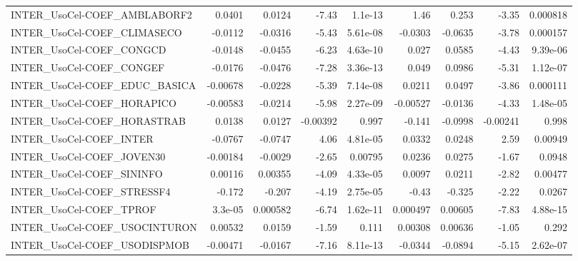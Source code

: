 \begin{tabular}{lrrrrrrrr}
INTER\_UsoCel-COEF\_AMBLABORF2          &      0.0401 &       0.0124 &    -7.43 &  1.1e-13 &       1.46 &       0.253 &        -3.35 &      0.000818 \\
INTER\_UsoCel-COEF\_CLIMASECO           &     -0.0112 &      -0.0316 &    -5.43 & 5.61e-08 &    -0.0303 &     -0.0635 &        -3.78 &      0.000157 \\
INTER\_UsoCel-COEF\_CONGCD              &     -0.0148 &      -0.0455 &    -6.23 & 4.63e-10 &      0.027 &      0.0585 &        -4.43 &      9.39e-06 \\
INTER\_UsoCel-COEF\_CONGEF              &     -0.0176 &      -0.0476 &    -7.28 & 3.36e-13 &      0.049 &      0.0986 &        -5.31 &      1.12e-07 \\
INTER\_UsoCel-COEF\_EDUC\_BASICA         &    -0.00678 &      -0.0228 &    -5.39 & 7.14e-08 &     0.0211 &      0.0497 &        -3.86 &      0.000111 \\
INTER\_UsoCel-COEF\_HORAPICO            &    -0.00583 &      -0.0214 &    -5.98 & 2.27e-09 &   -0.00527 &     -0.0136 &        -4.33 &      1.48e-05 \\
INTER\_UsoCel-COEF\_HORASTRAB           &      0.0138 &       0.0127 & -0.00392 &    0.997 &     -0.141 &     -0.0998 &     -0.00241 &         0.998 \\
INTER\_UsoCel-COEF\_INTER               &     -0.0767 &      -0.0747 &     4.06 & 4.81e-05 &     0.0332 &      0.0248 &         2.59 &       0.00949 \\
INTER\_UsoCel-COEF\_JOVEN30             &    -0.00184 &      -0.0029 &    -2.65 &  0.00795 &     0.0236 &      0.0275 &        -1.67 &        0.0948 \\
INTER\_UsoCel-COEF\_SININFO             &     0.00116 &      0.00355 &    -4.09 & 4.33e-05 &     0.0097 &      0.0211 &        -2.82 &       0.00477 \\
INTER\_UsoCel-COEF\_STRESSF4            &      -0.172 &       -0.207 &    -4.19 & 2.75e-05 &      -0.43 &      -0.325 &        -2.22 &        0.0267 \\
INTER\_UsoCel-COEF\_TPROF               &     3.3e-05 &     0.000582 &    -6.74 & 1.62e-11 &   0.000497 &     0.00605 &        -7.83 &      4.88e-15 \\
INTER\_UsoCel-COEF\_USOCINTURON         &     0.00532 &       0.0159 &    -1.59 &    0.111 &    0.00308 &     0.00636 &        -1.05 &         0.292 \\
INTER\_UsoCel-COEF\_USODISPMOB          &    -0.00471 &      -0.0167 &    -7.16 & 8.11e-13 &    -0.0344 &     -0.0894 &        -5.15 &      2.62e-07 \\

\end{tabular}
